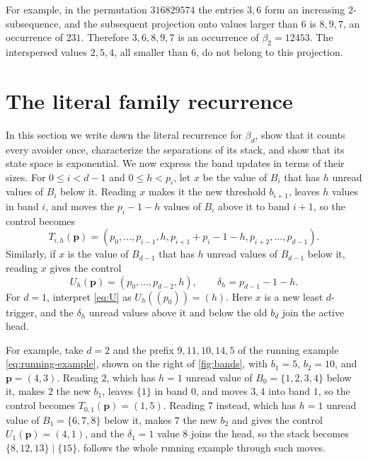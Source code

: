 \documentclass[11pt,reqno]{amsart}
\theoremstyle{definition}
\theoremstyle{remark}
\begin{document}
For example, in the permutation $316829574$ the entries $3,6$ form an increasing $2$-subsequence, and the subsequent
projection onto values larger than $6$ is $8,9,7$, an occurrence of $231$.
Therefore
$3,6,8,9,7$ is an occurrence of $\beta_2=12453$.  The interspersed values
$2,5,4$, all smaller than $6$, do not belong to this projection.

\section{The literal family recurrence}\label{sec:literal}

In this section we write down the literal recurrence for $\beta_d$, show that
it counts every avoider once, characterize the separations of its stack, and
show that its state space is exponential.  We now express the band updates in terms of their sizes.  For $0\leq i<d-1$ and
$0\leq h<p_i$, let $x$ be the value of $B_i$ that has $h$ unread values of
$B_i$ below it.  Reading $x$ makes it the new threshold $b_{i+1}$, leaves
$h$ values in band $i$, and moves the $p_i-1-h$ values of $B_i$ above it to
band $i+1$, so the control becomes
\begin{equation}\label{eq:T}
 T_{i,h}(\mathbf p)=
 (p_0,\ldots,p_{i-1},h,
  p_{i+1}+p_i-1-h,p_{i+2},\ldots,p_{d-1}).
\end{equation}
Similarly, if $x$ is the value of $B_{d-1}$ that has $h$ unread values of
$B_{d-1}$ below it, reading $x$ gives the control
\begin{equation}\label{eq:U}
 U_h(\mathbf p)=(p_0,\ldots,p_{d-2},h),
 \qquad \delta_h=p_{d-1}-1-h.
\end{equation}
For $d=1$, interpret \eqref{eq:U} as $U_h((p_0))=(h)$.
Here $x$ is a new least $d$-trigger, and the $\delta_h$ unread
values above it and below the old $b_d$ join the active head.

For example, take $d=2$ and the prefix $9,11,10,14,5$ of the running example
\eqref{eq:running-example}, shown on the right of \cref{fig:bands}, with
$b_1=5$, $b_2=10$, and $\mathbf p=(4,3)$.  Reading $2$, which has $h=1$
unread value of $B_0=\{1,2,3,4\}$ below it, makes $2$ the new $b_1$, leaves
$\{1\}$ in band $0$, and moves $3,4$ into band $1$, so the control becomes
$T_{0,1}(\mathbf p)=(1,5)$.  Reading $7$ instead, which has $h=1$ unread
value of $B_1=\{6,7,8\}$ below it, makes $7$ the new $b_2$ and gives the
control $U_1(\mathbf p)=(4,1)$, and the $\delta_1=1$ value $8$ joins the
head, so the stack becomes $\{8,12,13\}\mid\{15\}$.  
follows the whole running example through such moves.
\end{document}
